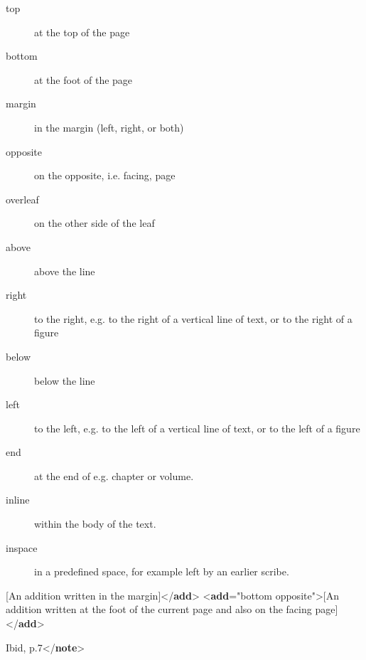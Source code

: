\begin{reflist}
\begin{sansreflist}
\begin{reflist}
\begin{description}
\item[{top}]at the top of the page
\item[{bottom}]at the foot of the page
\item[{margin}]in the margin (left, right, or both)
\item[{opposite}]on the opposite, i.e. facing, page
\item[{overleaf}]on the other side of the leaf
\item[{above}]above the line
\item[{right}]to the right, e.g. to the right of a vertical line of text, or to the right of a figure
\item[{below}]below the line
\item[{left}]to the left, e.g. to the left of a vertical line of text, or to the left of a figure
\item[{end}]at the end of e.g. chapter or volume.
\item[{inline}]within the body of the text.
\item[{inspace}]in a predefined space, for example left by an earlier scribe.
\end{description} 
    \item[][An addition written in the margin]{</\textbf{add}>}\mbox{}\newline 
{<\textbf{add}\hspace*{1em}{place}="{bottom opposite}">}[An addition written at the\mbox{}\newline 
 foot of the current page and also on the facing page]{</\textbf{add}>}
    \item[]Ibid, p.7{</\textbf{note}>}
\end{reflist}  
\end{sansreflist}  
\end{reflist}  
